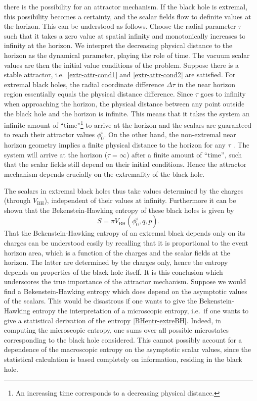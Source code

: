 \documentclass[12pt,twoside]{book}
\begin{document}
there is the possibility for an attractor mechanism. If the black hole is extremal, this possibility becomes a certainty, and the scalar fields flow to definite values at the horizon. This can be understood as follows. Choose the radial parameter $\tau$ such that it takes a zero value at spatial infinity and monotonically increases to infinity at the horizon. We interpret the decreasing physical distance to the horizon as the dynamical parameter, playing the role of time. The vacuum scalar values are then the initial value conditions of the problem. Suppose there is a stable attractor, i.e.\ \eqref{extr-attr-cond1} and \eqref{extr-attr-cond2} are satisfied. For extremal black holes, the radial coordinate difference $\Delta \tau$ in the near horizon region essentially equals the physical distance difference. Since $\tau$ goes to infinity when approaching the horizon, the physical distance between any point outside the black hole and the horizon is infinite.
This means that it takes the system an infinite amount of ``time''\footnote{An increasing time corresponds to a decreasing physical distance.} to arrive at the horizon and the scalars are guaranteed to reach their attractor values $\phi^{i}_{0}$. On the other hand, the non-extremal near horizon geometry implies a finite physical distance to the horizon for any $\tau$ \cite{Kallosh:uq}. The system will arrive at the horizon ($\tau = \infty$) after a finite amount of ``time'', such that the scalar fields still depend on their initial conditions. Hence the attractor mechanism depends crucially on the extremality of the black hole. 

The scalars in extremal black holes thus take values determined by the charges (through $V_{\mathrm{BH}}$), independent of their values at infinity. Furthermore it can be shown that the Bekenstein-Hawking entropy of these black holes is given by \cite{Goldstein:fk}
\begin{equation}\label{BHentr-extreBH}
S = \pi V_{\mathrm{BH}} (\phi_{0}^{i},q,p).
\end{equation}
That the Bekenstein-Hawking entropy of an extremal black depends only on its charges can be understood easily by recalling that it is proportional to the event horizon area, which is a function of the charges and the scalar fields at the horizon. The latter are determined by the charges only, hence the entropy depends on properties of the black hole itself.
It is this conclusion which underscores the true importance of the attractor mechanism. Suppose we would find a Bekenstein-Hawking entropy which does depend on the asymptotic values of the scalars. This would be disastrous if one wants to give the Bekenstein-Hawking entropy the interpretation of a microscopic entropy, i.e.\ if one wants to give a statistical derivation of the entropy \eqref{BHentr-extreBH}. Indeed, in computing the microscopic entropy, one sums over all possible microstates corresponding to the black hole considered. This cannot possibly account for a dependence of the macroscopic entropy on the asymptotic scalar values, since the statistical calculation is based completely on information, residing in the black hole.
\end{document}
